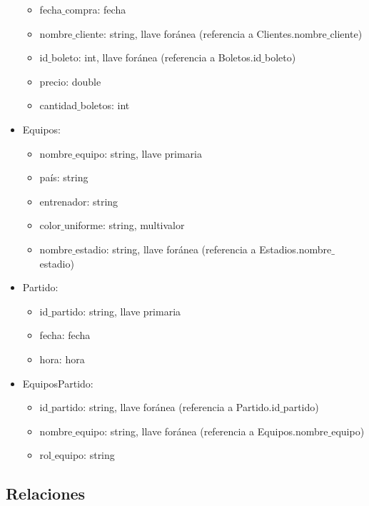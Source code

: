 \begin{itemize}
\begin{itemize}
        \item fecha$\_$compra: fecha
        \item nombre$\_$cliente: string,  llave foránea (referencia a Clientes.nombre$\_$cliente)
        \item id$\_$boleto: int, llave foránea (referencia a Boletos.id$\_$boleto)
        \item precio: double
        \item cantidad$\_$boletos: int
    \end{itemize}
    \item Equipos:
    \begin{itemize}
        \item nombre$\_$equipo: string, llave primaria
        \item país: string
        \item entrenador: string
        \item color$\_$uniforme: string, multivalor
        \item nombre$\_$estadio: string, llave foránea (referencia a Estadios.nombre$\_$estadio)
    \end{itemize}
    \item Partido:
    \begin{itemize}
        \item id$\_$partido: string, llave primaria
        \item fecha: fecha
        \item hora: hora
    \end{itemize}
    \item EquiposPartido:
    \begin{itemize}        
        \item id$\_$partido: string, llave foránea (referencia a Partido.id$\_$partido)
        \item nombre$\_$equipo: string, llave foránea (referencia a Equipos.nombre$\_$equipo)        
        \item rol$\_$equipo: string
    \end{itemize}
\end{itemize}

\subsection*{Relaciones}

